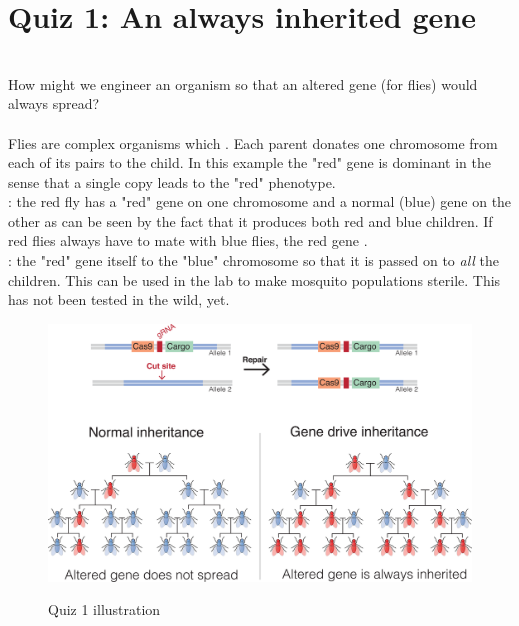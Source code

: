 \section{Quiz 1: An always inherited gene}
 \\ [.1in]
How might we engineer an organism so that an altered gene (for flies) would always spread? \\ [.2in]
 \\ [.1in]
Flies are complex organisms which . Each parent donates one chromosome from each of its pairs to the child. In this example the "red" gene is dominant in the sense that a single copy leads to the "red" phenotype.\\[.2in]
: the red fly has a "red" gene on one chromosome and a normal (blue) gene on the other as can be seen by the fact that it produces both red and blue children. If red flies always have to mate with blue flies, the red gene .\\[.2in]
: the "red" gene  itself to the "blue" chromosome so that it is passed on to \textit{all} the children. This can be used in the lab to make mosquito populations sterile. This has not been tested in the wild, yet.
\begin{figure}[h]
\centering
\includegraphics[width=1\textwidth]{images/Gene_Drive.png}\\[.2in]
\caption{Quiz 1 illustration} 
\end{figure}

